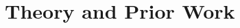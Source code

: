 \documentclass[sigconf,manuscript,review,anonymous]{acmart} %
\def\ts{TIPP\&SEE}
\def\umc{Use\begin{math}\rightarrow\end{math}Modify\begin{math}\rightarrow\end{math}Create\ }
\def\um{Use\begin{math}\rightarrow\end{math}Modify\ }
\begin{document}

\section{Theory and Prior Work}
\label{sec:background}
\thispagestyle{empty}

\end{document}

